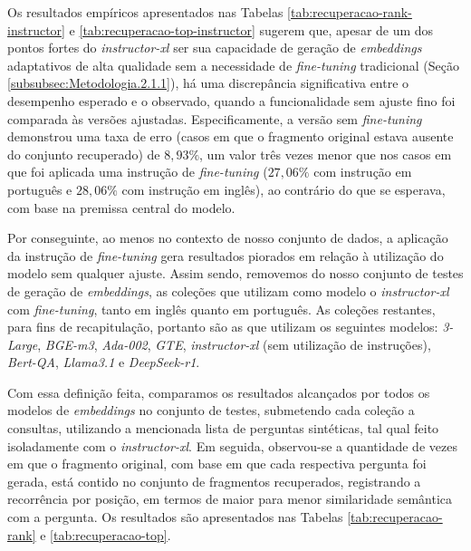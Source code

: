 Os resultados empíricos apresentados nas Tabelas \ref{tab:recuperacao-rank-instructor}  e \ref{tab:recuperacao-top-instructor} sugerem que, apesar de um dos pontos fortes do \textit{instructor-xl} ser sua capacidade de geração de \textit{embeddings} adaptativos de alta qualidade sem a necessidade de \textit{fine-tuning} tradicional (Seção \ref{subsubsec:Metodologia.2.1.1}),  há uma discrepância significativa entre o desempenho esperado e o observado, quando a funcionalidade sem ajuste fino foi comparada às versões ajustadas. Especificamente, a versão sem \textit{fine-tuning} demonstrou uma taxa de erro (casos em que o fragmento original estava ausente do conjunto recuperado) de $8,93\%$, um valor três vezes menor que nos casos em que foi aplicada uma instrução de \textit{fine-tuning} ($27,06\%$ com instrução em português e $28,06\%$ com instrução em inglês), ao contrário do que se esperava, com base na premissa central do modelo.

Por conseguinte, ao menos no contexto de nosso conjunto de dados, a aplicação da instrução de \textit{fine-tuning} gera resultados piorados em relação à utilização do modelo sem qualquer ajuste. Assim sendo, removemos do nosso conjunto de testes de geração de \textit{embeddings}, as coleções que utilizam como modelo o \textit{instructor-xl} com \textit{fine-tuning}, tanto em inglês quanto em português. As coleções restantes, para fins de recapitulação, portanto são as que utilizam os seguintes modelos: \textit{3-Large}, \textit{BGE-m3}, \textit{Ada-002}, \textit{GTE}, \textit{instructor-xl} (sem utilização de instruções), \textit{Bert-QA}, \textit{Llama3.1} e \textit{DeepSeek-r1}.


Com essa definição feita, comparamos os resultados alcançados por todos os modelos de \textit{embeddings} no conjunto de testes, submetendo cada coleção a consultas, utilizando a mencionada lista de perguntas sintéticas, tal qual feito isoladamente com o \textit{instructor-xl}. Em seguida, observou-se a quantidade de vezes em que o fragmento original, com base em que cada respectiva pergunta foi gerada, está contido no conjunto de fragmentos recuperados, registrando a recorrência por posição, em termos de maior para menor similaridade semântica com a pergunta. Os resultados são apresentados nas Tabelas \ref{tab:recuperacao-rank} e \ref{tab:recuperacao-top}.

